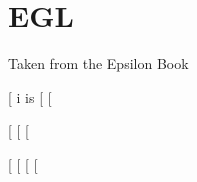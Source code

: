 \chapter{EGL}

Taken from the Epsilon Book

\begin{egl}
[%
i is [%
[%

[%
[%
[%
\end{egl}


\begin{egl}
[%
[%
[%
[%
\end{egl}

